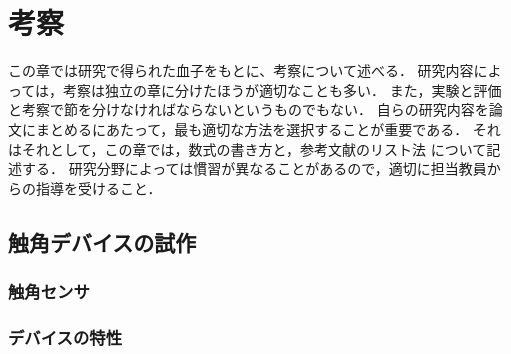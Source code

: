 \chapter{考察}	%
\thispagestyle{plain}   %

この章では研究で得られた血子をもとに、考察について述べる．
研究内容によっては，考察は独立の章に分けたほうが適切なことも多い．
また，実験と評価と考察で節を分けなければならないというものでもない．
自らの研究内容を論文にまとめるにあたって，最も適切な方法を選択することが重要である．
それはそれとして，この章では，数式の書き方と，参考文献のリスト法
について記述する．
研究分野によっては慣習が異なることがあるので，適切に担当教員からの指導を受けること．

\section{触角デバイスの試作}
\subsection{触角センサ}
\subsection{デバイスの特性}